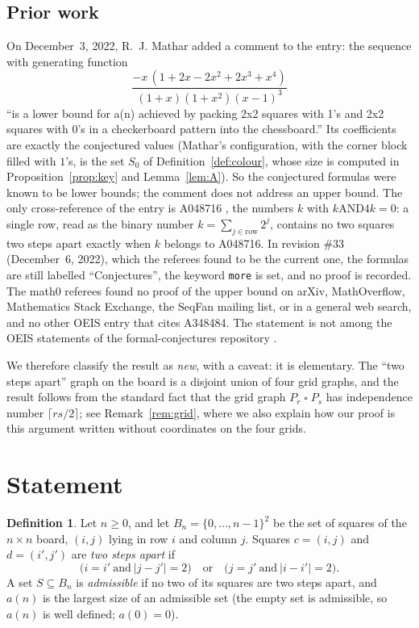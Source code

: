 \documentclass[11pt]{amsart}
\theoremstyle{plain}
\theoremstyle{definition}
\newtheorem{definition}[theorem]{Definition}
\newcommand{\B}{B_n}
\begin{document}
\subsection*{Prior work}
On December~3, 2022, R.~J. Mathar added a comment to the entry: the sequence with generating function
\[
  \frac{-x\,(1+2x-2x^2+2x^3+x^4)}{(1+x)(1+x^2)(x-1)^3}
\]
``is a lower bound for a(n) achieved by packing 2x2 squares with 1's and 2x2 squares with 0's in a checkerboard pattern into the chessboard.''
Its coefficients are exactly the conjectured values (Mathar's configuration, with the corner block filled with $1$'s, is the set $S_0$ of Definition~\ref{def:colour}, whose size is computed in Proposition~\ref{prop:key} and Lemma~\ref{lem:A}).
So the conjectured formulas were known to be lower bounds; the comment does not address an upper bound.
The only cross-reference of the entry is A048716 \cite{A048716}, the numbers $k$ with $k \mathbin{\mathrm{AND}} 4k=0$: a single row, read as the binary number $k=\sum_{j\in\text{row}}2^j$, contains no two squares two steps apart exactly when $k$ belongs to A048716.
In revision \#33 (December~6, 2022), which the referees found to be the current one, the formulas are still labelled ``Conjectures'', the keyword \texttt{more} is set, and no proof is recorded.
The math0 referees found no proof of the upper bound on arXiv, MathOverflow, Mathematics Stack Exchange, the SeqFan mailing list, or in a general web search, and no other OEIS entry that cites A348484.
The statement is not among the OEIS statements of the formal-conjectures repository \cite{FC}.

We therefore classify the result as \emph{new}, with a caveat: it is elementary.
The ``two steps apart'' graph on the board is a disjoint union of four grid graphs, and the result follows from the standard fact that the grid graph $P_r\mathbin{\square}P_s$ has independence number $\lceil rs/2\rceil$; see Remark~\ref{rem:grid}, where we also explain how our proof is this argument written without coordinates on the four grids.

\section{Statement}\label{sec:statement}

\begin{definition}\label{def:main}
Let $n\ge0$, and let $\B=\{0,\dots,n-1\}^2$ be the set of squares of the $n\times n$ board, $(i,j)$ lying in row $i$ and column $j$. Squares $c=(i,j)$ and $d=(i',j')$ are \emph{two steps apart} if
\[
  \bigl(i=i'\ \text{and}\ |j-j'|=2\bigr)\quad\text{or}\quad\bigl(j=j'\ \text{and}\ |i-i'|=2\bigr).
\]
A set $S\subseteq\B$ is \emph{admissible} if no two of its squares are two steps apart, and $a(n)$ is the largest size of an admissible set (the empty set is admissible, so $a(n)$ is well defined; $a(0)=0$).
\end{definition}
\end{document}
